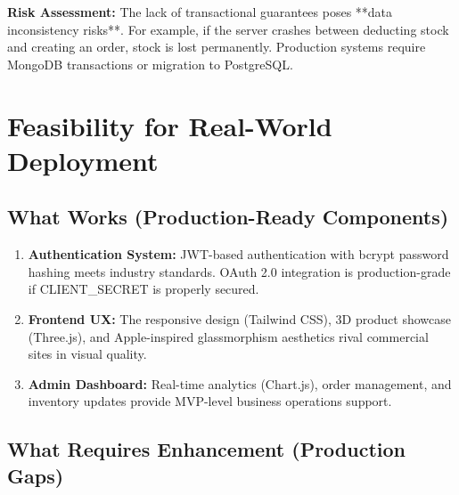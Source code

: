 \textbf{Risk Assessment:} The lack of transactional guarantees poses **data inconsistency risks**. For example, if the server crashes between deducting stock and creating an order, stock is lost permanently. Production systems require MongoDB transactions or migration to PostgreSQL.

\section{Feasibility for Real-World Deployment}

\subsection{What Works (Production-Ready Components)}

\begin{enumerate}
    \item \textbf{Authentication System:} JWT-based authentication with bcrypt password hashing meets industry standards. OAuth 2.0 integration is production-grade if CLIENT\_SECRET is properly secured.
    
    \item \textbf{Frontend UX:} The responsive design (Tailwind CSS), 3D product showcase (Three.js), and Apple-inspired glassmorphism aesthetics rival commercial sites in visual quality.
    
    \item \textbf{Admin Dashboard:} Real-time analytics (Chart.js), order management, and inventory updates provide MVP-level business operations support.
\end{enumerate}

\subsection{What Requires Enhancement (Production Gaps)}

